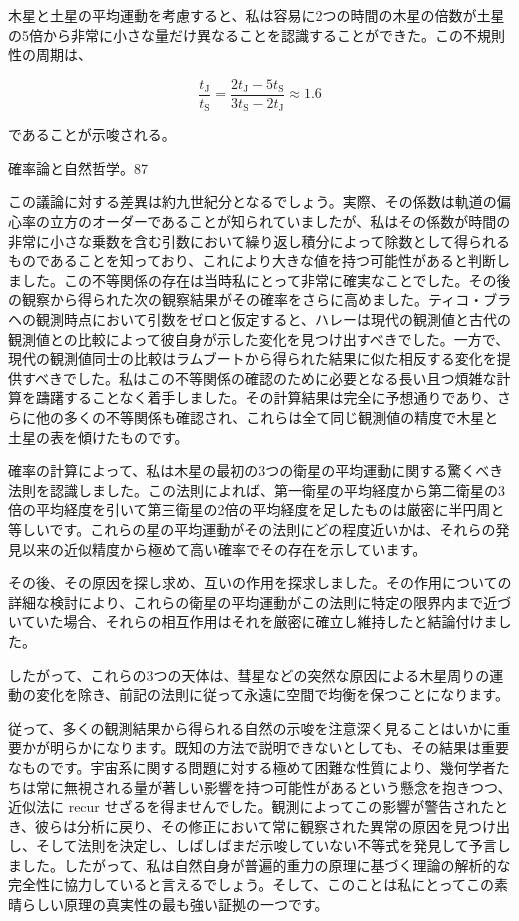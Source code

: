 \documentclass[a4paper,11pt,openany]{ltjsbook}
\begin{document}
木星と土星の平均運動を考慮すると、私は容易に2つの時間の木星の倍数が土星の5倍から非常に小さな量だけ異なることを認識することができた。この不規則性の周期は、

$$
\frac{t_{\text{J}}}{t_{\text{S}}} = \frac{2 t_{\text{J}} - 5 t_{\text{S}}}{3 t_{\text{S}} - 2 t_{\text{J}}} \approx 1.6
$$

であることが示唆される。

確率論と自然哲学。87

この議論に対する差異は約九世紀分となるでしょう。実際、その係数は軌道の偏心率の立方のオーダーであることが知られていましたが、私はその係数が時間の非常に小さな乗数を含む引数において繰り返し積分によって除数として得られるものであることを知っており、これにより大きな値を持つ可能性があると判断しました。この不等関係の存在は当時私にとって非常に確実なことでした。その後の観察から得られた次の観察結果がその確率をさらに高めました。ティコ・ブラヘの観測時点において引数をゼロと仮定すると、ハレーは現代の観測値と古代の観測値との比較によって彼自身が示した変化を見つけ出すべきでした。一方で、現代の観測値同士の比較はラムブートから得られた結果に似た相反する変化を提供すべきでした。私はこの不等関係の確認のために必要となる長い且つ煩雑な計算を躊躇することなく着手しました。その計算結果は完全に予想通りであり、さらに他の多くの不等関係も確認され、これらは全て同じ観測値の精度で木星と土星の表を傾けたものです。

確率の計算によって、私は木星の最初の3つの衛星の平均運動に関する驚くべき法則を認識しました。この法則によれば、第一衛星の平均経度から第二衛星の3倍の平均経度を引いて第三衛星の2倍の平均経度を足したものは厳密に半円周と等しいです。これらの星の平均運動がその法則にどの程度近いかは、それらの発見以来の近似精度から極めて高い確率でその存在を示しています。

その後、その原因を探し求め、互いの作用を探求しました。その作用についての詳細な検討により、これらの衛星の平均運動がこの法則に特定の限界内まで近づいていた場合、それらの相互作用はそれを厳密に確立し維持したと結論付けました。

したがって、これらの3つの天体は、彗星などの突然な原因による木星周りの運動の変化を除き、前記の法則に従って永遠に空間で均衡を保つことになります。

従って、多くの観測結果から得られる自然の示唆を注意深く見ることはいかに重要かが明らかになります。既知の方法で説明できないとしても、その結果は重要なものです。宇宙系に関する問題に対する極めて困難な性質により、幾何学者たちは常に無視される量が著しい影響を持つ可能性があるという懸念を抱きつつ、近似法に recur せざるを得ませんでした。観測によってこの影響が警告されたとき、彼らは分析に戻り、その修正において常に観察された異常の原因を見つけ出し、そして法則を決定し、しばしばまだ示唆していない不等式を発見して予言しました。したがって、私は自然自身が普遍的重力の原理に基づく理論の解析的な完全性に協力していると言えるでしょう。そして、このことは私にとってこの素晴らしい原理の真実性の最も強い証拠の一つです。
\end{document}
